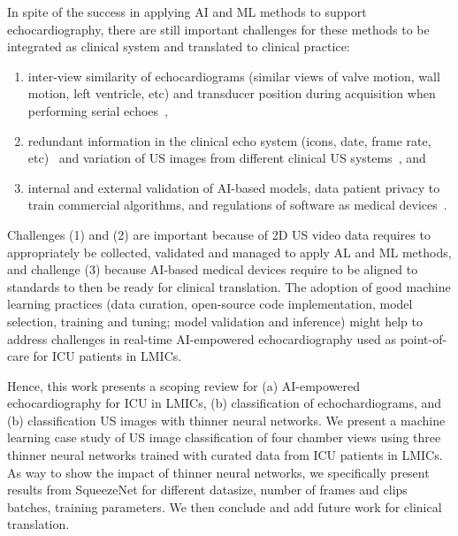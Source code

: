\documentclass[mlabstract,twocolumn]{jmlr}
\begin{document}
In spite of the success in applying AI and ML methods to support echocardiography, there are still important challenges for these methods to be integrated as clinical system and translated to clinical practice:
\begin{enumerate}
\setlength\itemsep{0em}
\item inter-view similarity of echocardiograms (similar views of valve motion, wall motion, left ventricle, etc) and transducer position during acquisition when performing serial echoes~\citep{zhang2018},
\item redundant information in the clinical echo system (icons, date, frame rate, etc)~\citep{khamis2017} and variation of US images from different clinical US systems~\citep{brindise2020unsupervised}, and
\item internal and external validation of AI-based models, data patient privacy to train commercial algorithms, and regulations of software as medical devices~\citep{2022_Stewart_Emergency_Medicine_Australasia}.
\end{enumerate}
Challenges (1) and (2) are important because of 2D US video data requires to appropriately be collected, validated and managed to apply AL and ML methods, and challenge (3) because AI-based medical devices require to be aligned to standards to then be ready for clinical translation.
The adoption of good machine learning practices (data curation, open-source code implementation, model selection, training and tuning; model validation and inference) might help to address challenges in real-time AI-empowered echocardiography used as point-of-care for ICU patients in LMICs.

Hence, this work presents a scoping review for (a) AI-empowered echocardiography for ICU in LMICs, (b) classification of echochardiograms, and (b) classification US images with thinner neural networks.
We present a machine learning case study of US image classification of four chamber views using three thinner neural networks trained with curated data from ICU patients in LMICs.
As way to show the impact of thinner neural networks, we specifically present results from SqueezeNet for different datasize, number of frames and clips batches, training parameters.
We then conclude and add future work for clinical translation.
\end{document}
